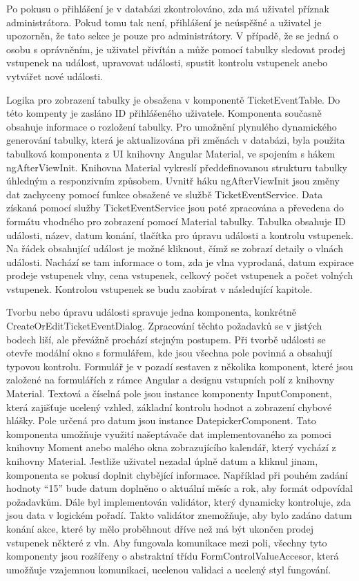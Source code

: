 Po pokusu o přihlášení je v databázi zkontrolováno, zda má uživatel příznak administrátora. Pokud tomu tak není, přihlášení je neúspěšné a uživatel je upozorněn, že tato sekce je pouze pro administrátory. V případě, že se jedná o osobu s oprávněním, je uživatel přivítán a může pomocí tabulky sledovat prodej vstupenek na událost, upravovat události, spustit kontrolu vstupenek anebo vytvářet nové události.

Logika pro zobrazení tabulky je obsažena v komponentě TicketEventTable. Do této kompenty je zasláno ID přihlášeného uživatele. Komponenta současně obsahuje informace o rozložení tabulky. Pro umožnění plynulého dynamického generování tabulky, která je aktualizována při změnách v databázi, byla použita tabulková komponenta z UI knihovny Angular Material, ve spojením s hákem ngAfterViewInit. Knihovna Material vykreslí předdefinovanou strukturu tabulky úhledným a responzivním způsobem. Uvnitř háku ngAfterViewInit jsou změny dat zachyceny pomocí funkce obsažené ve službě TicketEventService. Data získaná pomocí služby TicketEventService jsou poté zpracována a převedena do formátu vhodného pro zobrazení pomocí Material tabulky. Tabulka obsahuje ID události, název, datum konání, tlačítka pro úpravu události a kontrolu vstupenek. Na řádek obsahující událost je možné kliknout, čímž se zobrazí detaily o vlnách události. Nachází se tam informace o tom, zda je vlna vyprodaná, datum expirace prodeje vstupenek vlny, cena vstupenek, celkový počet vstupenek a počet volných vstupenek. Kontrolou vstupenek se budu zaobírat v následující kapitole.

Tvorbu nebo úpravu události spravuje jedna komponenta, konkrétně CreateOrEditTicketEventDialog. Zpracování těchto požadavků se v jistých bodech liší, ale převážně prochází stejným postupem. Při tvorbě události se otevře modální okno s formulářem, kde jsou všechna pole povinná a obsahují typovou kontrolu. Formulář je v pozadí sestaven z několika komponent, které jsou založené na formulářích z rámce Angular a designu vstupních polí z knihovny Material. Textová a číselná pole jsou instance komponenty InputComponent, která zajišťuje ucelený vzhled, základní kontrolu hodnot a zobrazení chybové hlášky. Pole určená pro datum jsou instance DatepickerComponent. Tato komponenta umožňuje využití našeptávače dat implementovaného za pomoci knihovny Moment anebo malého okna zobrazujícího kalendář, který vychází z knihovny Material. Jestliže uživatel nezadal úplně datum a kliknul jinam, komponenta se pokusí doplnit chybějící informace. Například při pouhém zadání hodnoty “15” bude datum doplněno o aktuální měsíc a rok, aby formát odpovídal požadavkům. Dále byl implementován validátor, který dynamicky kontroluje, zda jsou data v logickém pořadí. Takto validátor znemožňuje, aby bylo zadáno datum konání akce, které by mělo proběhnout dříve než má být ukončen prodej vstupenek některé z vln. Aby fungovala komunikace mezi poli, všechny tyto komponenty jsou rozšířeny o abstraktní třídu FormControlValueAccesor, která umožňuje vzajemnou komunikaci, ucelenou validaci a ucelený styl fungování.

